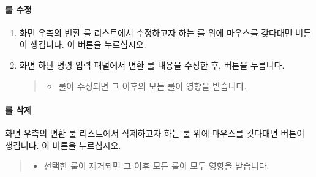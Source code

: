 \documentclass[letterpaper,10pt,english]{sphinxmanual}
\begin{document}
\paragraph{룰 수정}
\label{\detokenize{discovery/part07/edit_rules:id7}}\begin{enumerate}
\def\theenumi{\arabic{enumi}}
\def\labelenumi{\theenumi .}
\makeatletter\def\p@enumii{\p@enumi \theenumi .}\makeatother
\item {} 
화면 우측의 변환 룰 리스트에서 수정하고자 하는 룰 위에 마우스를 갖다대면  버튼이 생깁니다. 이 버튼을 누르십시오.
\begin{quote}

\begin{figure}[H]
\centering

\noindent{}
\end{figure}
\end{quote}

\item {} 
화면 하단 명령 입력 패널에서 변환 룰 내용을 수정한 후,  버튼을 누릅니다.
\begin{quote}
\begin{itemize}
\item {} 
룰이 수정되면 그 이후의 모든 룰이 영향을 받습니다.

\end{itemize}

\begin{figure}[H]
\centering

\noindent{}
\end{figure}
\end{quote}

\end{enumerate}


\paragraph{룰 삭제}
\label{\detokenize{discovery/part07/edit_rules:id8}}
화면 우측의 변환 룰 리스트에서 삭제하고자 하는 룰 위에 마우스를 갖다대면  버튼이 생깁니다. 이 버튼을 누르십시오.
\begin{quote}
\begin{itemize}
\item {} 
선택한 룰이 제거되면 그 이후 모든 룰이 모두 영향을 받습니다.

\end{itemize}

\begin{figure}[H]
\centering

\noindent{}
\end{figure}
\end{quote}
\end{document}
